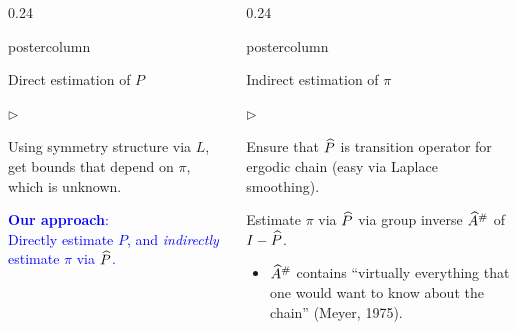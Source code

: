 \documentclass[notheorems,final]{beamer}
\newcommand{\compresslist}{%
  \setlength{\itemsep}{1pt}%
  \setlength{\parskip}{0pt}%
  \setlength{\parsep}{0pt}%
  \setlength{\leftmargin}{0.7cm}%
}
\newlength{\columnheight}
\newcommand{\GREEN}[1]{\textcolor{boldgreen}{#1}}
\newcommand{\BLUE}[1]{\textcolor{blue}{#1}}
\begin{document}
\begin{frame}{}
\begin{columns}
\begin{column}{0.24\textwidth}
\begin{beamercolorbox}[center,wd=\textwidth]{postercolumn}
\begin{minipage}[T]{.95\textwidth}
{\begin{block}{Direct estimation of $P$}
\begin{list}{$\triangleright$}
                  \item
                    Using symmetry structure via $L$, get bounds that
                    depend on $\pi$, which is unknown.

                \end{list}

                \begin{center}
                  \BLUE{%
                    \textbf{Our approach}: \\
                    Directly estimate $P$, and \emph{indirectly} estimate $\pi$ via
                    $\widehat P$.
                  }
                \end{center}


              \end{block}
            }
          \end{minipage}
        \end{beamercolorbox}
      \end{column}
      \begin{column}{0.24\textwidth}
        \begin{beamercolorbox}[center,wd=\textwidth]{postercolumn}
          \begin{minipage}[T]{.95\textwidth}
            \parbox[t][\columnheight]{\textwidth}{
              \begin{block}{Indirect estimation of $\pi$}

                \begin{list}{$\triangleright$}\compresslist
                  \item
                    Ensure that $\widehat P$ is transition operator for
                    ergodic chain {\small(easy via Laplace
                    smoothing)}.

                    \smallskip

                  \item
                    Estimate $\pi$ via $\widehat P$ via \GREEN{group
                    inverse} $\widehat A^\#$ of $I - \widehat P$.

                    \smallskip

                    \begin{itemize}\compresslist
                      \item
                        $\widehat A^\#$ contains ``virtually everything
                        that one would want to know about the chain''
                        {\small(Meyer, 1975)}.


\end{itemize}
\end{list}
\end{block}}
\end{minipage}
\end{beamercolorbox}
\end{column}
\end{columns}
\end{frame}
\end{document}
